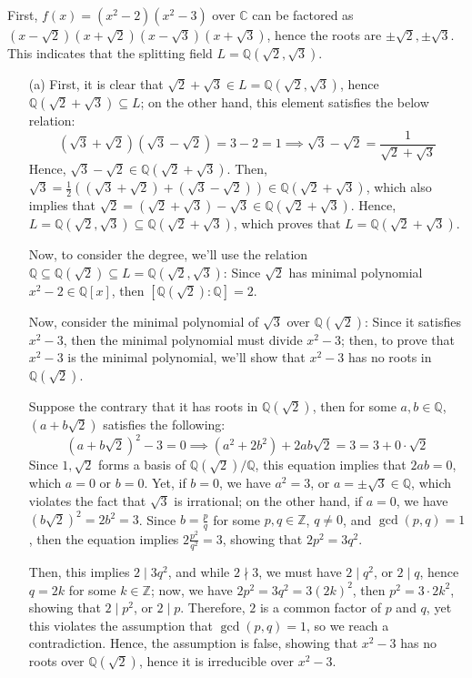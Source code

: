 \documentclass{article}
\newcommand{\QQ}{\mathbb{Q}}
\newcommand{\CC}{\mathbb{C}}
\begin{document}
First, $f(x)=(x^2-2)(x^2-3)$ over $\CC$ can be factored as $(x-\sqrt{2})(x+\sqrt{2})(x-\sqrt{3})(x+\sqrt{3})$, hence the roots are $\pm\sqrt{2},\pm\sqrt{3}$. This indicates that the splitting field $L=\QQ(\sqrt{2},\sqrt{3})$.
\begin{itemize}
    \item[(a)] First, it is clear that $\sqrt{2}+\sqrt{3}\in L=\QQ(\sqrt{2},\sqrt{3})$, hence $\QQ(\sqrt{2}+\sqrt{3})\subseteq L$; on the other hand, this element satisfies the below relation:
    \begin{equation}
        \label{eq:5}
        (\sqrt{3}+\sqrt{2})(\sqrt{3}-\sqrt{2}) = 3-2 = 1\implies \sqrt{3}-\sqrt{2}=\frac{1}{\sqrt{2}+\sqrt{3}}
    \end{equation}
    Hence, $\sqrt{3}-\sqrt{2}\in \QQ(\sqrt{2}+\sqrt{3})$. Then, $\sqrt{3} = \frac{1}{2}((\sqrt{3}+\sqrt{2})+(\sqrt{3}-\sqrt{2}))\in\QQ(\sqrt{2}+\sqrt{3})$, which also implies that $\sqrt{2} = (\sqrt{2}+\sqrt{3})-\sqrt{3}\in \QQ(\sqrt{2}+\sqrt{3})$. Hence, $L=\QQ(\sqrt{2},\sqrt{3})\subseteq \QQ(\sqrt{2}+\sqrt{3})$, which proves that $L=\QQ(\sqrt{2}+\sqrt{3})$.

    Now, to consider the degree, we'll use the relation $\QQ\subseteq \QQ(\sqrt{2})\subseteq L=\QQ(\sqrt{2},\sqrt{3})$: Since $\sqrt{2}$ has minimal polynomial $x^2-2\in\QQ[x]$, then $[\QQ(\sqrt{2}):\QQ]=2$. 
    
    Now, consider the minimal polynomial of $\sqrt{3}$ over $\QQ(\sqrt{2})$: Since it satisfies $x^2-3$, then the minimal polynomial must divide $x^2-3$; then, to prove that $x^2-3$ is the minimal polynomial, we'll show that $x^2-3$ has no roots in $\QQ(\sqrt{2})$. 
    
    Suppose the contrary that it has roots in $\QQ(\sqrt{2})$, then for some $a,b\in \QQ$, $(a+b\sqrt{2})$ satisfies the following: 
    \begin{equation}
        \label{eq:6}
        (a+b\sqrt{2})^2-3 = 0\implies (a^2+2b^2)+2ab\sqrt{2} = 3 = 3+0\cdot \sqrt{2}
    \end{equation}
    Since $1,\sqrt{2}$ forms a basis of $\QQ(\sqrt{2})/\QQ$, this equation implies that $2ab = 0$, which $a = 0$ or $b=0$. Yet, if $b=0$, we have $a^2=3$, or $a=\pm\sqrt{3}\in\QQ$, which violates the fact that $\sqrt{3}$ is irrational; on the other hand, if $a=0$, we have $(b\sqrt{2})^2 = 2b^2 =3$. Since $b = \frac{p}{q}$ for some $p,q\in\mathbb{Z}$, $q\neq 0$, and $\gcd(p,q)=1$, then the equation implies $2\frac{p^2}{q^2}=3$, showing that $2p^2=3q^2$. 
    
    Then, this implies $2\mid 3q^2$, and while $2\nmid 3$, we must have $2\mid q^2$, or $2\mid q$, hence $q = 2k$ for some $k\in\mathbb{Z}$; now, we have $2p^2 = 3q^2 = 3(2k)^2$, then $p^2 = 3\cdot 2k^2$, showing that $2\mid p^2$, or $2\mid p$. Therefore, $2$ is a common factor of $p$ and $q$, yet this violates the assumption that $\gcd(p,q)=1$, so we reach a contradiction. Hence, the assumption is false, showing that $x^2-3$ has no roots over $\QQ(\sqrt{2})$, hence it is irreducible over $x^2-3$.


\end{itemize}
\end{document}
